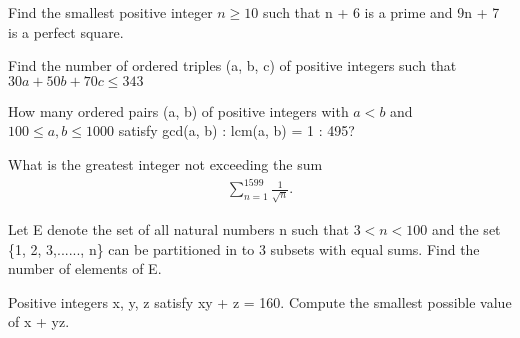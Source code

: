 \item Find the smallest positive integer $n \geq 10$ such that n + 6 is a prime and 9n + 7 is a perfect square.

\item Find the number of ordered triples (a, b, c) of positive integers such that $30a + 50b + 70c \leq 343$

\item How many ordered pairs (a, b) of positive integers with $a < b$ and $100 \leq a, b \leq 1000$ satisfy gcd(a, b) : lcm(a, b) = 1 : 495?

\item What is the greatest integer not exceeding the sum
\begin{align*} 
\sum_{n=1}^{1599} \frac{1}{\sqrt{n}}.
\end{align*}

\item Let E denote the set of all natural numbers n such that $3 < n < 100$ and the set \{1, 2, 3,......, n\} can be partitioned in to 3 subsets with equal sums. Find the number of elements of E.

\item Positive integers x, y, z satisfy xy + z = 160. Compute the smallest possible value of x + yz.